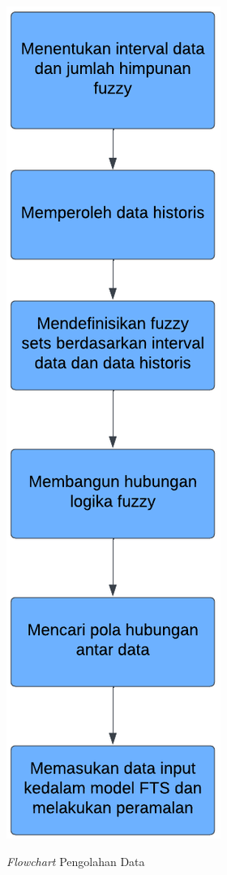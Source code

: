 \documentclass[conference]{IEEEtran}
\begin{document}
\begin{figure}[htbp]
    \centering
    {\includegraphics[scale=0.7]{images/Flowchart.png}} 
    \caption{\textit{Flowchart} Pengolahan Data}
\end{figure}
\end{document}
